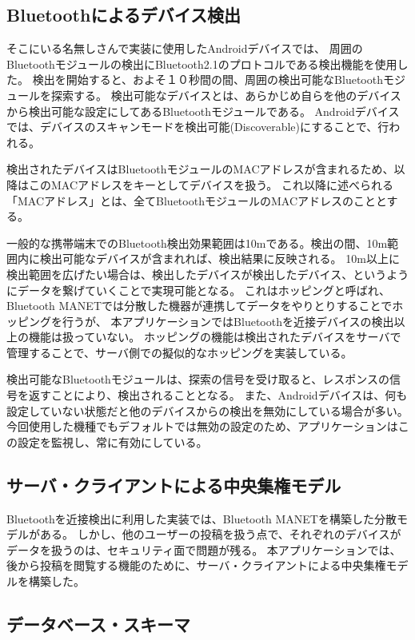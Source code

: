 \newpage

\subsection{Bluetoothによるデバイス検出}

そこにいる名無しさんで実装に使用したAndroidデバイスでは、
周囲のBluetoothモジュールの検出にBluetooth2.1のプロトコルである検出機能を使用した。
検出を開始すると、およそ１０秒間の間、周囲の検出可能なBluetoothモジュールを探索する。
検出可能なデバイスとは、あらかじめ自らを他のデバイスから検出可能な設定にしてあるBluetoothモジュールである。
Androidデバイスでは、デバイスのスキャンモードを検出可能(Discoverable)にすることで、行われる。

検出されたデバイスはBluetoothモジュールのMACアドレスが含まれるため、以降はこのMACアドレスをキーとしてデバイスを扱う。
これ以降に述べられる「MACアドレス」とは、全てBluetoothモジュールのMACアドレスのこととする。

一般的な携帯端末でのBluetooth検出効果範囲は10mである。検出の間、10m範囲内に検出可能なデバイスが含まれれば、検出結果に反映される。
10m以上に検出範囲を広げたい場合は、検出したデバイスが検出したデバイス、というようにデータを繋げていくことで実現可能となる。
これはホッピングと呼ばれ、Bluetooth MANETでは分散した機器が連携してデータをやりとりすることでホッピングを行うが、
本アプリケーションではBluetoothを近接デバイスの検出以上の機能は扱っていない。
ホッピングの機能は検出されたデバイスをサーバで管理することで、サーバ側での擬似的なホッピングを実装している。

検出可能なBluetoothモジュールは、探索の信号を受け取ると、レスポンスの信号を返すことにより、検出されることとなる。
また、Androidデバイスは、何も設定していない状態だと他のデバイスからの検出を無効にしている場合が多い。
今回使用した機種でもデフォルトでは無効の設定のため、アプリケーションはこの設定を監視し、常に有効にしている。


\subsection{サーバ・クライアントによる中央集権モデル}

Bluetoothを近接検出に利用した実装では、Bluetooth MANETを構築した分散モデルがある。
しかし、他のユーザーの投稿を扱う点で、それぞれのデバイスがデータを扱うのは、セキュリティ面で問題が残る。
本アプリケーションでは、後から投稿を閲覧する機能のために、サーバ・クライアントによる中央集権モデルを構築した。


\subsection{データベース・スキーマ}

